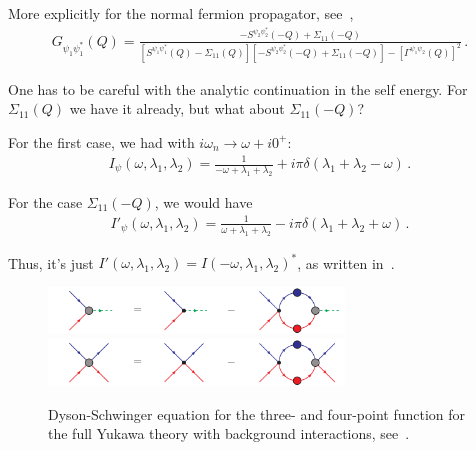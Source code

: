 More explicitly for the normal fermion propagator, see~\cite{Perali2004, Pieri2004-1},
\begin{align}
	G_{\psi_1\psi_1^*}(Q) = \frac{-S^{\psi_2\psi_2^*}(-Q)+\Sigma_{11}(-Q)}{\left[S^{\psi_1\psi_1^*}(Q)-\Sigma_{11}(Q)\right]
	\left[-S^{\psi_2\psi_2^*}(-Q)+\Sigma_{11}(-Q)\right] - \left[\Gamma^{\psi_1\psi_2}(Q)\right]^2} \,.
\end{align}

One has to be careful with the analytic continuation in the self energy. For $\Sigma_{11}(Q)$ we have it already, but what about $\Sigma_{11}(-Q)$?

For the first case, we had with $i\omega_n \rightarrow \omega + i0^+$:
\begin{align}
	I_{\psi}(\omega,\lambda_1,\lambda_2) = \frac{1}{-\omega + \lambda_1 + \lambda_2}
	+ i \pi \delta(\lambda_1 + \lambda_2 - \omega) \,.
\end{align}

For the case $\Sigma_{11}(-Q)$, we would have
\begin{align}
	I'_{\psi}(\omega,\lambda_1,\lambda_2) = \frac{1}{\omega + \lambda_1 + \lambda_2}
	- i \pi \delta(\lambda_1 + \lambda_2 + \omega) \,.
\end{align}

Thus, it's just $I'(\omega,\lambda_1,\lambda_2) = I(-\omega,\lambda_1,\lambda_2)^*$, as written in~\cite{Pieri2004-1}.


\begin{figure}[b]
	\begin{center}
		\includegraphics[width=0.7\textwidth]{figs/vertex3_DSE.pdf}\\
		\vspace{0.5cm}
		\includegraphics[width=0.7\textwidth]{figs/vertex4_DSE.pdf}
	\end{center}
	\caption[Vertex DSE]{Dyson-Schwinger equation for the three- and four-point function for the full Yukawa theory with background interactions, see~\cite{Diehl2006-1}.}
	\label{fig:vertex_prop_DSE}
\end{figure}


\clearpage

